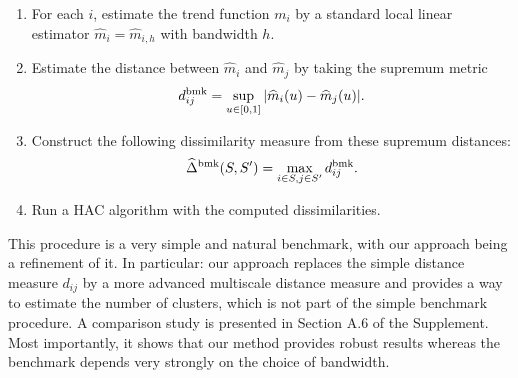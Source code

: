 \documentclass[a4paper,12pt]{article}
\begin{document}
\begin{enumerate}[label=\arabic*.,leftmargin=0.6cm]
\begin{enumerate}[label=\textit{Step \arabic*}.,leftmargin=1.5cm,itemsep=0pt,parsep=0pt,topsep=3pt]
\item For each $i$, estimate the trend function $m_i$ by a standard local linear estimator $\widehat{m}_i = \widehat{m}_{i,h}$ with bandwidth $h$.
\item Estimate the distance between $\widehat{m}_i$ and $\widehat{m}_j$ by taking the supremum metric 
\[ d_{ij}^{\textnormal{bmk}} = \sup_{u \in [0,1]} |\widehat{m}_i(u) - \widehat{m}_j(u)|. \]
\item Construct the following dissimilarity measure from these supremum distances:
\[ \widehat{\Delta}^{\textnormal{bmk}}(S,S') = \max_{i \in S,j \in S'} d_{ij}^{\textnormal{bmk}}. \]
\item Run a HAC algorithm with the computed dissimilarities. 
\end{enumerate}
%
%
This procedure is a very simple and natural benchmark, with our approach being a refinement of it. In particular: our approach replaces the simple distance measure $d_{ij}$ by a more advanced multiscale distance measure and provides a way to estimate the number of clusters, which is not part of the simple benchmark procedure. A comparison study is presented in Section A.6 of the Supplement. Most importantly, it shows that our method provides robust results whereas the benchmark depends very strongly on the choice of bandwidth.  


\end{enumerate}
\end{document}
